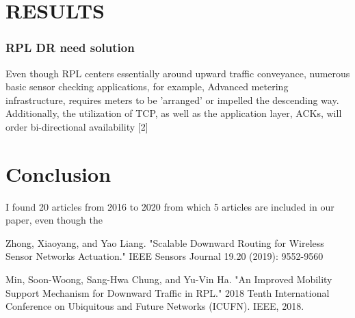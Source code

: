 \documentclass[12pt,journal,comsoc, letterpaper, twocolumn]{IEEEtran}
\begin{document}
\section{RESULTS}


 


\subsubsection{RPL DR need solution}	

Even though RPL centers essentially around upward traffic conveyance, numerous basic sensor checking applications, for example, Advanced metering infrastructure, requires meters to be 'arranged' or impelled the descending way. Additionally, the utilization of TCP, as well as the application layer, ACKs, will order bi-directional availability [2]



\section{Conclusion}

I found 20 articles from 2016 to 2020 from which 5 articles are included in our paper, even though the 




















\ifCLASSOPTIONcaptionsoff
  \newpage
\fi



\begin{thebibliography}{1} 

Zhong, Xiaoyang, and Yao Liang. "Scalable Downward Routing for Wireless Sensor Networks Actuation." IEEE Sensors Journal 19.20 (2019): 9552-9560


Min, Soon-Woong, Sang-Hwa Chung, and Yu-Vin Ha. "An Improved Mobility Support Mechanism for Downward Traffic in RPL." 2018 Tenth International Conference on Ubiquitous and Future Networks (ICUFN). IEEE, 2018.














\end{thebibliography}
\end{document}
